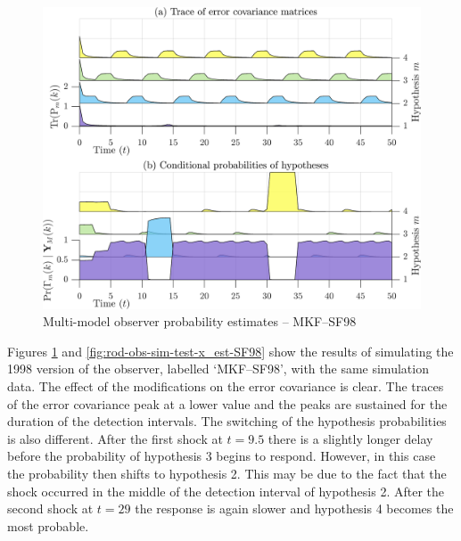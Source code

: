 \begin{figure}[htp]
	\centering
	\includegraphics[width=12cm]{images/rod_MKF_test_sim_MKF_SF98_prob.png}
	\caption{Multi-model observer probability estimates – MKF--SF98}
	\label{fig:rod-obs-sim-test-probs-SF98}
\end{figure}
Figures \ref{fig:rod-obs-sim-test-probs-SF98} and \ref{fig:rod-obs-sim-test-x_est-SF98} show the results of simulating the 1998 version of the observer, labelled `MKF--SF98', with the same simulation data. The effect of the modifications on the error covariance is clear. The traces of the error covariance peak at a lower value and the peaks are sustained for the duration of the detection intervals. The switching of the hypothesis probabilities is also different. After the first shock at $t=9.5$ there is a slightly longer delay before the probability of hypothesis 3 begins to respond. However, in this case the probability then shifts to hypothesis 2. This may be due to the fact that the shock occurred in the middle of the detection interval of hypothesis 2. After the second shock at $t=29$ the response is again slower and hypothesis 4 becomes the most probable.

